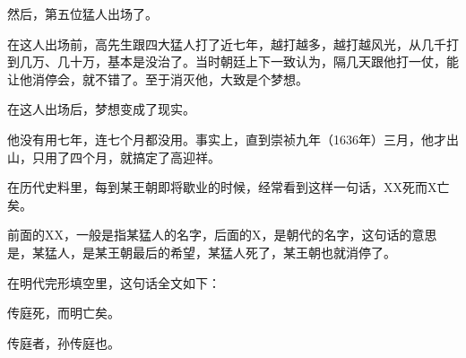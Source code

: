 \begin{multicols}{\theparacolNo}
		然后，第五位猛人出场了。

		在这人出场前，高先生跟四大猛人打了近七年，越打越多，越打越风光，从几千打到几万、几十万，基本是没治了。当时朝廷上下一致认为，隔几天跟他打一仗，能让他消停会，就不错了。至于消灭他，大致是个梦想。

		在这人出场后，梦想变成了现实。

		他没有用七年，连七个月都没用。事实上，直到崇祯九年（1636年）三月，他才出山，只用了四个月，就搞定了高迎祥。

		在历代史料里，每到某王朝即将歇业的时候，经常看到这样一句话，XX死而X亡矣。

		前面的XX，一般是指某猛人的名字，后面的X，是朝代的名字，这句话的意思是，某猛人，是某王朝最后的希望，某猛人死了，某王朝也就消停了。

		在明代完形填空里，这句话全文如下：

		传庭死，而明亡矣。

		传庭者，孙传庭也。
		\ifnum{}
	\end{multicols}
\fi
\newpage

